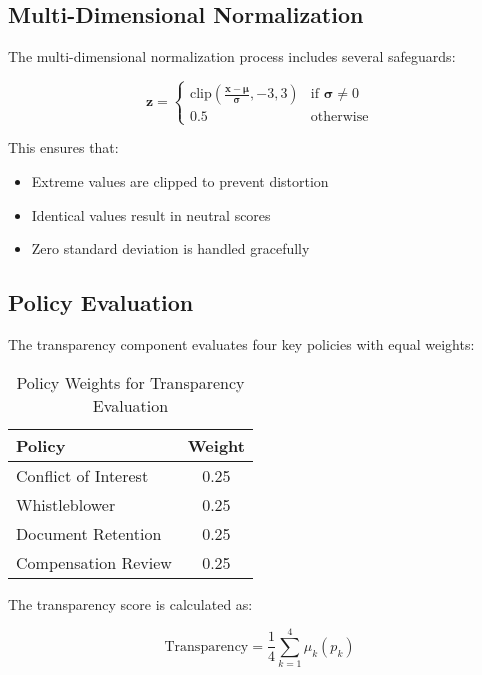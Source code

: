\documentclass[12pt]{article}
\begin{document}
\subsection{Multi-Dimensional Normalization}

The multi-dimensional normalization process includes several safeguards:

\begin{equation}
    \mathbf{z} = 
    \begin{cases}
    \text{clip}\left(\frac{\mathbf{x} - \mathbf{\mu}}{\mathbf{\sigma}}, -3, 3\right) & \text{if } \mathbf{\sigma} \neq 0 \\
    0.5 & \text{otherwise}
    \end{cases}
\end{equation}

This ensures that:
\begin{itemize}
    \item Extreme values are clipped to prevent distortion
    \item Identical values result in neutral scores
    \item Zero standard deviation is handled gracefully
\end{itemize}

\subsection{Policy Evaluation}

The transparency component evaluates four key policies with equal weights:

\begin{table}[h]
\centering
\begin{tabular}{|l|c|}
\hline
\textbf{Policy} & \textbf{Weight} \\
\hline
Conflict of Interest & 0.25 \\
Whistleblower & 0.25 \\
Document Retention & 0.25 \\
Compensation Review & 0.25 \\
\hline
\end{tabular}
\caption{Policy Weights for Transparency Evaluation}
\label{tab:policy_weights}
\end{table}

The transparency score is calculated as:

\begin{equation}
    \text{Transparency} = \frac{1}{4}\sum_{k=1}^{4} \mu_k(p_k)
\end{equation}
\end{document}
